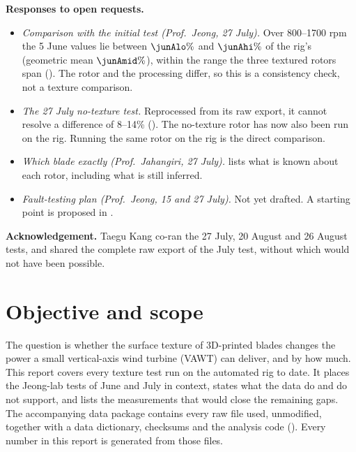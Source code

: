 \documentclass[11pt]{article}
\begin{document}
\textbf{Responses to open requests.}
\begin{itemize}[leftmargin=1.2em]
  \item \emph{Comparison with the initial test (Prof.\ Jeong, 27 July).} Over 800–1700 rpm the
        5 June values lie between $\junAlo\%$ and $\junAhi\%$ of the rig's 
        (geometric mean $\junAmid\%$), within the range the three textured rotors span
        (). The rotor and the processing differ, so this is a consistency
        check, not a texture comparison.
  \item \emph{The 27 July no-texture test.} Reprocessed from its raw export, it cannot resolve a
        difference of 8–14\% (). \ifHaveSmooth The no-texture rotor has now
        also been run on the rig. \else Running the same rotor on the rig is the direct
        comparison. \fi
  \item \emph{Which blade exactly (Prof.\ Jahangiri, 27 July).}  lists
        what is known about each rotor, including what is still inferred.
  \item \emph{Fault-testing plan (Prof.\ Jeong, 15 and 27 July).} Not yet drafted. A starting
        point is proposed in .
\end{itemize}

\textbf{Acknowledgement.} Taegu Kang co-ran the 27 July, 20 August and 26 August tests, and
shared the complete raw export of the July test, without which  would not
have been possible.

{\setlength{\parskip}{0pt}\setcounter{tocdepth}{1}\small\tableofcontents}
\clearpage

\section{Objective and scope}

The question is whether the surface texture of 3D-printed blades changes the power a small
vertical-axis wind turbine (VAWT) can deliver, and by how much. This report covers every
texture test run on the automated rig to date. It places the Jeong-lab tests of June and July
in context, states what the data do and do not support, and lists the measurements that would
close the remaining gaps. The accompanying data package contains every raw file used,
unmodified, together with a data dictionary, checksums and the analysis code
(). Every number in this report is generated from those files.
\end{document}
